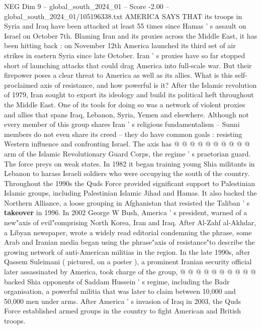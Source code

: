 \begin{textsample}{NEG Dim 9 – global\_south\_2024\_01 – Score -2.00 – global\_south\_2024\_01/105196338.txt}  \label{ex:f9_neg_388}
AMERICA SAYS THAT its troops in Syria and Iraq have been attacked at least 55 times since Hamas ' s assault on Israel on October 7th.
Blaming Iran and its proxies across the Middle East, it has been hitting back : on November 12th America launched its third set of air strikes in eastern Syria since late October.
Iran ' s proxies have so far stopped short of launching attacks that could drag America into full-scale war.
But their firepower poses a clear threat to America as well as its allies.
What is this self-proclaimed axis of resistance, and how powerful is it?
After the Islamic revolution of 1979, Iran sought to export its ideology and build its political heft throughout the Middle East.
One of its tools for doing so was a network of violent proxies and allies that spans Iraq, Lebanon, Syria, Yemen and elsewhere.
Although not every member of this group shares Iran ' s religious fundamentalism -- Sunni members do not even share its creed -- they do have common goals : resisting Western influence and confronting Israel.
The axis has @ @ @ @ @ @ @ @ @ @ arm of the Islamic Revolutionary Guard Corps, the regime ' s praetorian guard.
The force preys on weak states.
In 1982 it began training young Shia militants in Lebanon to harass Israeli soldiers who were occupying the south of the country.
Throughout the 1990s the Quds Force provided significant support to Palestinian Islamic groups, including Palestinian Islamic Jihad and Hamas.
It also backed the Northern Alliance, a loose grouping in Afghanistan that resisted the Taliban ' s \textbf{takeover} in 1996.
In 2002 George W Bush, America ' s president, warned of a new"axis of evil"comprising North Korea, Iran and Iraq.
After Al-Zahf al-Akhdar, a Libyan newspaper, wrote a widely read editorial condemning the phrase, some Arab and Iranian media began using the phrase"axis of resistance"to describe the growing network of anti-American militias in the region.
In the late 1990s, after Qassem Suleimani ( pictured, on a poster ), a prominent Iranian security official later assassinated by America, took charge of the group, @ @ @ @ @ @ @ @ @ @ backed Shia opponents of Saddam Hussein ' s regime, including the Badr organisation, a powerful militia that was later to claim between 10,000 and 50,000 men under arms.
After America ' s invasion of Iraq in 2003, the Quds Force established armed groups in the country to fight American and British troops.

\end{textsample}
